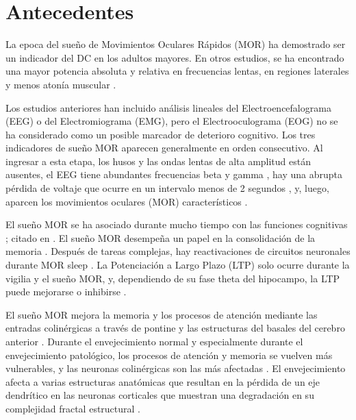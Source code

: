 \section{Antecedentes}

La epoca del sueño de Movimientos Oculares Rápidos (MOR) ha demostrado ser un indicador del DC en los adultos mayores. En otros estudios, se ha encontrado una mayor potencia absoluta y relativa en frecuencias lentas, en regiones laterales \cite{Brayet} y menos atonía muscular \cite{Chen}.

Los estudios anteriores han incluido análisis lineales del Electroencefalograma (EEG) o del Electromiograma (EMG), pero el Electrooculograma (EOG) no se ha considerado como un posible marcador de deterioro cognitivo. Los tres indicadores de sueño MOR aparecen generalmente en orden consecutivo. Al ingresar a esta etapa, los husos y las ondas lentas de alta amplitud están ausentes, el EEG tiene abundantes frecuencias beta y gamma \cite{SteriadeIntracortical1996,Llinas}, hay una abrupta pérdida de voltaje que ocurre en un intervalo menos de 2 segundos \cite{Rosales-Lagarde2009}, y, luego, aparcen los movimientos oculares (MOR) característicos \cite{Aserinsky,AASM2007,Rechtshaffen1968}.

El sueño MOR se ha asociado durante mucho tiempo con las funciones cognitivas \cite{Moruzzi1963}; 
citado en \cite{Corsi1983}. El sueño MOR desempeña un papel en la consolidación de la memoria 
\cite{Lucero, Leconte1971, Leconte1972, Fishbein1971, Fishbein1977, Pearlman1971, Pearlman1973, Pearlman1974, Smith}.
Después de tareas complejas, hay reactivaciones de circuitos neuronales durante MOR sleep \cite{Louie}. 
La Potenciación a Largo Plazo (LTP) solo ocurre durante la vigilia y el sueño MOR, y, dependiendo de su fase theta del hipocampo, la LTP puede mejorarse o inhibirse \cite{Pavlides1988}.


El sueño MOR mejora la memoria y los procesos de atención mediante las entradas colinérgicas \cite{Braun} a través de pontine \cite{Datta2004} y las estructuras del basales del cerebro anterior \cite{Blake}. Durante el envejecimiento normal y especialmente durante el envejecimiento patológico, los procesos de atención y memoria se vuelven más vulnerables, y las neuronas colinérgicas son las más afectadas \cite{Schliebs2011}. El envejecimiento afecta a varias estructuras anatómicas que resultan en la pérdida de un eje dendrítico en las neuronas corticales que muestran una degradación en su complejidad fractal estructural \cite{Lipsitz}.


